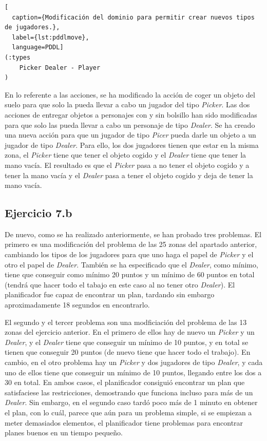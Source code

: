 \documentclass[11pt,a4paper]{article}
\begin{document}
\begin{algorithm}[H]
\begin{lstlisting}[
  caption={Modificación del dominio para permitir crear nuevos tipos de jugadores.},
  label={lst:pddlmove},
  language=PDDL]
(:types
	Picker Dealer - Player
)
\end{lstlisting}
\end{algorithm}

En lo referente a las acciones, se ha modificado la acción de coger un objeto del suelo para que solo la pueda llevar a cabo un
jugador del tipo \textit{Picker}. Las dos acciones de entregar objetos a personajes con y sin bolsillo han sido modificadas para que
solo las pueda llevar a cabo un personaje de tipo \textit{Dealer}. Se ha creado una nueva acción para que un jugador de tipo
\textit{Picer} pueda darle un objeto a un jugador de tipo \textit{Dealer}. Para ello, los dos jugadores tienen que estar en la misma
zona, el \textit{Picker} tiene que tener el objeto cogido y el \textit{Dealer} tiene que tener la mano vacía. El resultado es que
el \textit{Picker} pasa a no tener el objeto cogido y a tener la mano vacía y el \textit{Dealer} pasa a tener el objeto cogido y
deja de tener la mano vacía.

\subsection{Ejercicio 7.b}

De nuevo, como se ha realizado anteriormente, se han probado tres problemas. El primero es una modificación del problema de las 25
zonas del apartado anterior, cambiando los tipos de los jugadores para que uno haga el papel de \textit{Picker} y el otro el papel
de \textit{Dealer}. También se ha especificado que el \textit{Dealer}, como mínimo, tiene que conseguir como mínimo 20 puntos y
un mínimo de 60 puntos en total (tendrá que hacer todo el tabajo en este caso al no tener otro \textit{Dealer}). El planificador
fue capaz de encontrar un plan, tardando sin embargo aproximadamente 18 segundos en encontrarlo.

El segundo y el tercer problema son una modficiación del problema de las 13 zonas del ejercicio anterior. En el primero de ellos
hay de nuevo un \textit{Picker} y un \textit{Dealer}, y el \textit{Dealer} tiene que conseguir un mínimo de 10 puntos, y en total
se tienen que conseguir 20 puntos (de nuevo tiene que hacer todo el trabajo). En cambio, en el otro problema hay un \textit{Picker}
y dos jugadores de tipo \textit{Dealer}, y cada uno de ellos tiene que conseguir un mínimo de 10 puntos, llegando entre los dos a 30
en total. En ambos casos, el planificador consiguió encontrar un plan que satisfaciese las restricciones, demostrando que funciona
incluso para más de un \textit{Dealer}. Sin embargo, en el segundo caso tardó poco más de 1 minuto en obtener el plan, con lo cuál,
parece que aún para un problema simple, si se empiezan a meter demasiados elementos, el planificador tiene problemas para encontrar
planes buenos en un tiempo pequeño.
\end{document}
